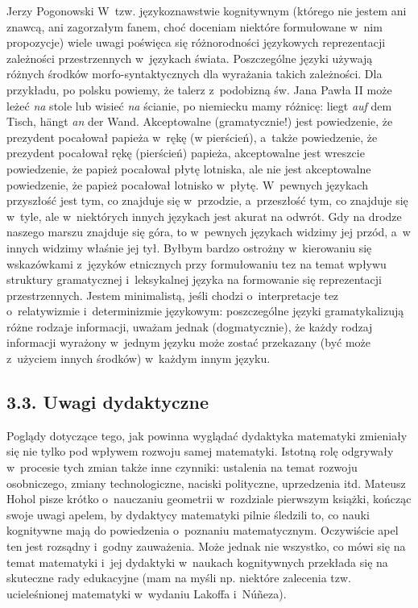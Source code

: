 \begin{newrevplenv}{Jerzy Pogonowski}
W~tzw. językoznawstwie kognitywnym (którego nie jestem ani znawcą,
ani zagorzałym fanem, choć doceniam niektóre formułowane w~nim
propozycje) wiele uwagi poświęca się różnorodności językowych
reprezentacji zależności przestrzennych w~językach świata.
Poszczególne języki używają różnych środków morfo-syntaktycznych
dla wyrażania takich zależności. Dla przykładu, po polsku powiemy, że talerz z~podobizną św. Jana Pawła II może leżeć {\em na} stole lub wisieć
{\em na} ścianie, po niemiecku mamy różnicę: liegt {\em auf} dem
Tisch, h\"{a}ngt {\em an} der Wand. Akceptowalne (gramatycznie!)
jest powiedzenie, że prezydent pocałował papieża w~rękę (w
pierścień), a~także powiedzenie, że prezydent pocałował rękę
(pierścień) papieża, akceptowalne jest wreszcie powiedzenie, że
papież pocałował płytę lotniska, ale nie jest akceptowalne
powiedzenie, że papież pocałował lotnisko w~płytę. W~pewnych
językach przyszłość jest tym, co znajduje się w~przodzie, a~przeszłość tym, co znajduje się w~tyle, ale w~niektórych innych
językach jest akurat na odwrót. Gdy na drodze naszego marszu
znajduje się góra, to w~pewnych językach widzimy jej przód, a~w
innych widzimy właśnie jej tył. Byłbym bardzo ostrożny w~kierowaniu się wskazówkami z~języków etnicznych przy formułowaniu
tez na temat wpływu struktury gramatycznej i~leksykalnej języka na
formowanie się reprezentacji przestrzennych. Jestem minimalistą,
jeśli chodzi o~interpretacje tez o~relatywizmie i~determinizmie
językowym: poszczególne języki gramatykalizują różne rodzaje
informacji, uważam jednak (dogmatycznie), że każdy rodzaj
informacji wyrażony w~jednym języku może zostać przekazany (być
może z~użyciem innych środków) w~każdym innym języku.

\subsection{3.3. Uwagi dydaktyczne}

Poglądy dotyczące tego, jak powinna wyglądać dydaktyka matematyki
zmieniały się nie tylko pod wpływem rozwoju samej matematyki.
Istotną rolę odgrywały w~procesie tych zmian także inne czynniki:
ustalenia na temat rozwoju osobniczego, zmiany technologiczne,
naciski polityczne, uprzedzenia itd. Mateusz Hohol pisze krótko o~nauczaniu geometrii w~rozdziale pierwszym książki, kończąc swoje
uwagi apelem, by dydaktycy matematyki pilnie śledzili to, co nauki
kognitywne mają do powiedzenia o~poznaniu matematycznym.
Oczywiście apel ten jest rozsądny i~godny zauważenia. Może jednak
nie wszystko, co mówi się na temat matematyki i~jej dydaktyki w~naukach kognitywnych przekłada się na skuteczne rady edukacyjne
(mam na myśli np. niektóre zalecenia tzw. ucieleśnionej matematyki
w~wydaniu Lakoffa i~N\'{u}\~{n}eza).


\end{newrevplenv}
